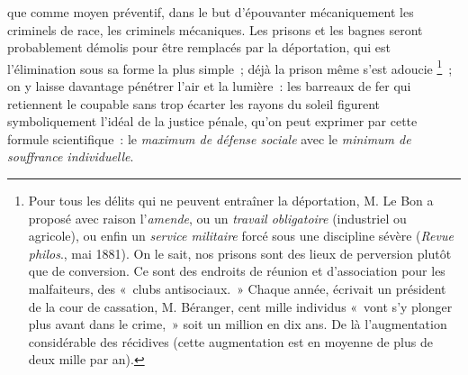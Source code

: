 \documentclass[french,twoside]{book} %
\begin{document}
que comme moyen préventif, dans le but d’épouvanter mécaniquement les criminels de race, les criminels mécaniques. Les prisons et les bagnes seront probablement démolis pour être remplacés par la déportation, qui est l’élimination sous sa forme la plus simple ; déjà la prison même s’est adoucie \footnote{Pour tous les délits qui ne peuvent entraîner la déportation, M. Le Bon a proposé avec raison l’\emph{amende}, ou un \emph{travail obligatoire} (industriel ou agricole), ou enfin un \emph{service militaire} forcé sous une discipline sévère (\emph{Revue philos}., mai 1881). On le sait, nos prisons sont des lieux de perversion plutôt que de conversion. Ce sont des endroits de réunion et d’association pour les malfaiteurs, des « clubs antisociaux. » Chaque année, écrivait un président de la cour de cassation, M. Béranger, cent mille individus « vont s’y plonger plus avant dans le crime, » soit un million en dix ans. De là l’augmentation considérable des récidives (cette augmentation est en moyenne de plus de deux mille par an).} ; on y laisse davantage pénétrer l’air et la lumière : les barreaux de fer qui retiennent le coupable sans trop écarter les rayons du soleil figurent symboliquement l’idéal de la justice pénale, qu’on peut exprimer par cette formule scientifique : le \emph{maximum de défense sociale} avec le \emph{minimum de souffrance individuelle}.\par
\end{document}
